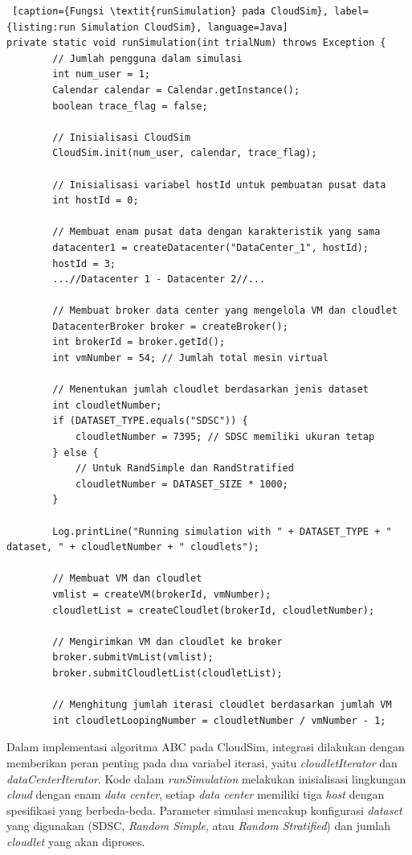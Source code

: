 \begin{lstlisting} [caption={Fungsi \textit{runSimulation} pada CloudSim}, label={listing:run Simulation CloudSim}, language=Java]
private static void runSimulation(int trialNum) throws Exception {
        // Jumlah pengguna dalam simulasi
        int num_user = 1;
        Calendar calendar = Calendar.getInstance();
        boolean trace_flag = false;

        // Inisialisasi CloudSim
        CloudSim.init(num_user, calendar, trace_flag);

        // Inisialisasi variabel hostId untuk pembuatan pusat data
        int hostId = 0;

        // Membuat enam pusat data dengan karakteristik yang sama
        datacenter1 = createDatacenter("DataCenter_1", hostId);
        hostId = 3;
        ...//Datacenter 1 - Datacenter 2//...

        // Membuat broker data center yang mengelola VM dan cloudlet
        DatacenterBroker broker = createBroker();
        int brokerId = broker.getId();
        int vmNumber = 54; // Jumlah total mesin virtual
        
        // Menentukan jumlah cloudlet berdasarkan jenis dataset
        int cloudletNumber;
        if (DATASET_TYPE.equals("SDSC")) {
            cloudletNumber = 7395; // SDSC memiliki ukuran tetap
        } else {
            // Untuk RandSimple dan RandStratified
            cloudletNumber = DATASET_SIZE * 1000;
        }
        
        Log.printLine("Running simulation with " + DATASET_TYPE + " dataset, " + cloudletNumber + " cloudlets");

        // Membuat VM dan cloudlet
        vmlist = createVM(brokerId, vmNumber);
        cloudletList = createCloudlet(brokerId, cloudletNumber);

        // Mengirimkan VM dan cloudlet ke broker
        broker.submitVmList(vmlist);
        broker.submitCloudletList(cloudletList);

        // Menghitung jumlah iterasi cloudlet berdasarkan jumlah VM
        int cloudletLoopingNumber = cloudletNumber / vmNumber - 1;

\end{lstlisting}

Dalam implementasi algoritma ABC pada CloudSim, integrasi dilakukan dengan memberikan peran penting pada dua variabel iterasi, yaitu \textit{cloudletIterator} dan \textit{dataCenterIterator}. Kode dalam \textit{runSimulation} melakukan inisialisasi lingkungan \textit{cloud} dengan enam \textit{data center}, setiap \textit{data center} memiliki tiga \textit{host} dengan spesifikasi yang berbeda-beda. Parameter simulasi mencakup konfigurasi \textit{dataset} yang digunakan (SDSC, \textit{Random Simple}, atau \textit{Random Stratified}) dan jumlah \textit{cloudlet} yang akan diproses.

